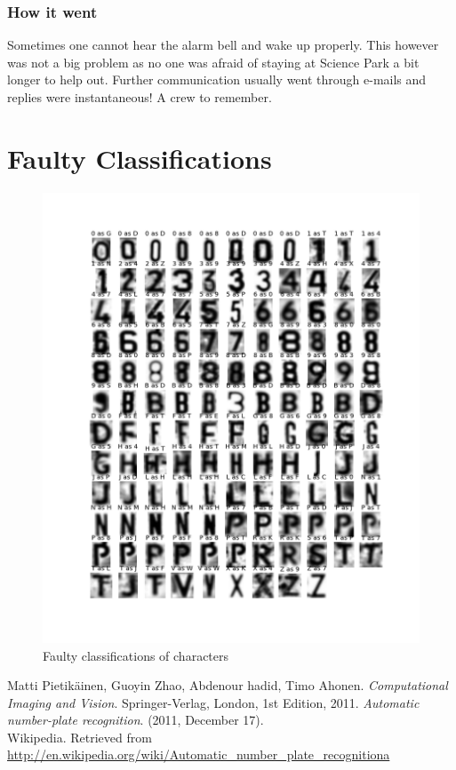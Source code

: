 \documentclass[a4paper]{article}
\begin{document}
\subsubsection*{How it went}

Sometimes one cannot hear the alarm bell and wake up properly. This however was
not a big problem as no one was afraid of staying at Science Park a bit longer
to help out. Further communication usually went through e-mails and replies
were instantaneous! A crew to remember.

\appendix

\section{Faulty Classifications}

\begin{figure}[H]
    \hspace{-2cm}
    \includegraphics[scale=0.5]{faulty.png}
    \caption{Faulty classifications of characters}
\end{figure}

\begin{thebibliography}{9}
        Matti Pietik\"ainen, Guoyin Zhao, Abdenour hadid,
        Timo Ahonen.
        \emph{Computational Imaging and Vision}.
        Springer-Verlag, London,
        1st Edition,
        2011.
        \emph{Automatic number-plate recognition}. (2011, December 17). \\
        Wikipedia.
        Retrieved from
        \url{http://en.wikipedia.org/wiki/Automatic_number_plate_recognitiona}
\end{thebibliography}
\end{document}
